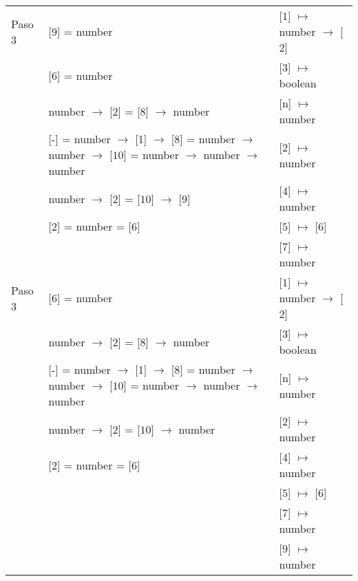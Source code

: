 \documentclass{article}
\begin{document}
\begin{center}
\begin{longtable}{ | l | p{10 cm} | p{5 cm} | }
 Paso 3  & [$\boxed{9}$] = number												& [$\boxed{1}$] $\mapsto$ number $\rightarrow$ [$\boxed{2}$] \\
	 & [$\boxed{6}$] = number												& [$\boxed{3}$] $\mapsto$ boolean	\\ 
	 & number $\rightarrow$ [$\boxed{2}$] = [$\boxed{8}$] $\rightarrow$ number						& [n] $\mapsto$ number	\\
	 & [-] = number $\rightarrow$ [1] $\rightarrow$ [$\boxed{8}$] = number $\rightarrow$ number $\rightarrow$ [$\boxed{10}$] =
	   number $\rightarrow$ number $\rightarrow$ number									& [2] $\mapsto$ number	\\
	 & number $\rightarrow$ [$\boxed{2}$] = [$\boxed{10}$] $\rightarrow$ [$\boxed{9}$] 					& [$\boxed{4}$] $\mapsto$ number	\\ 
	 & [$\boxed{2}$] = number = [$\boxed{6}$]										& [$\boxed{5}$] $\mapsto$ [$\boxed{6}$]	\\ 
	 &	& [$\boxed{7}$] $\mapsto$ number \\ \hline
	 
 Paso 3  & [$\boxed{6}$] = number												& [$\boxed{1}$] $\mapsto$ number $\rightarrow$ [$\boxed{2}$] \\ 
	 & number $\rightarrow$ [$\boxed{2}$] = [$\boxed{8}$] $\rightarrow$ number						& [$\boxed{3}$] $\mapsto$ boolean	\\
	 & [-] = number $\rightarrow$ [1] $\rightarrow$ [$\boxed{8}$] = number $\rightarrow$ number $\rightarrow$ [$\boxed{10}$] =
	   number $\rightarrow$ number $\rightarrow$ number									& [n] $\mapsto$ number	\\
	 & number $\rightarrow$ [$\boxed{2}$] = [$\boxed{10}$] $\rightarrow$ number	 					& [2] $\mapsto$ number	\\ 
	 & [$\boxed{2}$] = number = [$\boxed{6}$]										& [$\boxed{4}$] $\mapsto$ number	\\ 
	 &	& [$\boxed{5}$] $\mapsto$ [$\boxed{6}$] \\
	 &	& [$\boxed{7}$] $\mapsto$ number \\ 
	 &	& [$\boxed{9}$] $\mapsto$ number \\ \hline
	 

\end{longtable}
\end{center}
\end{document}
